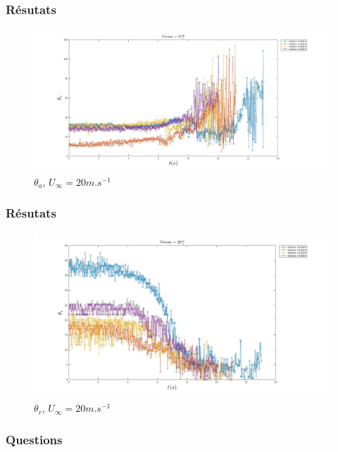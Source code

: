 \documentclass{beamer}
\begin{document}
\begin{frame}
\frametitle{Résutats}
\begin{figure}[!ht]

	\includegraphics[width = \linewidth]{./image/v=20oa_2.jpg}
	\caption{$\theta_{a}$, $U_{\infty}=20m.s^{-1}$}
		\label{fig:v=20oa_2}
\end{figure}
\end{frame}

\begin{frame}
\frametitle{Résutats}
\begin{figure}[!ht]
        \centering
	\includegraphics[width = \linewidth]{./image/v=20or_2.jpg}
	\caption{$\theta_{r}$, $U_{\infty}=20m.s^{-1}$}
		\label{fig:v=20or_2}
\end{figure}
\end{frame}

\begin{frame}
\frametitle{Questions}
\end{frame}
\end{document}
